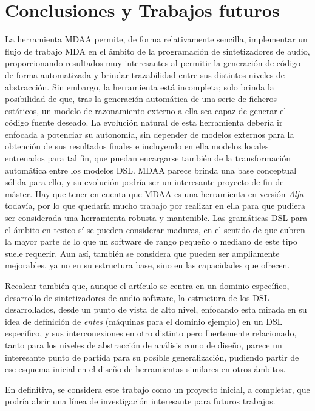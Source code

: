 \section{Conclusiones y Trabajos futuros}

La herramienta MDAA permite, de forma relativamente sencilla, implementar un flujo de trabajo MDA en el ámbito de la programación de sintetizadores de audio, proporcionando resultados muy interesantes al permitir la generación de código de forma automatizada y brindar trazabilidad entre sus distintos niveles de abstracción. Sin embargo, la herramienta está incompleta; solo brinda la posibilidad de que, tras la generación automática de una serie de ficheros estáticos, un modelo de razonamiento externo a ella sea capaz de generar el código fuente deseado. La evolución natural de esta herramienta debería ir enfocada a potenciar su autonomía, sin depender de modelos externos para la obtención de sus resultados finales e incluyendo en ella modelos locales entrenados para tal fin, que puedan encargarse también de la transformación automática entre los modelos DSL. MDAA parece brinda una base conceptual sólida para ello, y su evolución podría ser un interesante proyecto de fin de máster. Hay que tener en cuenta que MDAA es una herramienta en versión \textit{Alfa} todavía, por lo que quedaría mucho trabajo por realizar en ella para que pudiera ser considerada una herramienta robusta y mantenible. Las gramáticas DSL para el ámbito en testeo sí se pueden considerar maduras, en el sentido de que cubren la mayor parte de lo que un software de rango pequeño o mediano de este tipo suele requerir. Aun así, también se considera que pueden ser ampliamente mejorables, ya no en su estructura base, sino en las capacidades que ofrecen.

Recalcar también que, aunque el artículo se centra en un dominio específico, desarrollo de sintetizadores de audio software, la estructura de los DSL desarrollados, desde un punto de vista de alto nivel, enfocando esta mirada en su idea de definición de \textit{entes} (máquinas para el dominio ejemplo) en un DSL especifico, y sus interconexiones en otro distinto pero fuertemente relacionado, tanto para los niveles de abstracción de análisis como de diseño, parece un interesante punto de partida para su posible generalización, pudiendo partir de ese esquema inicial en el diseño de herramientas similares en otros ámbitos.

En definitiva, se considera este trabajo como un proyecto inicial, a completar, que podría abrir una línea de investigación interesante para futuros trabajos.

